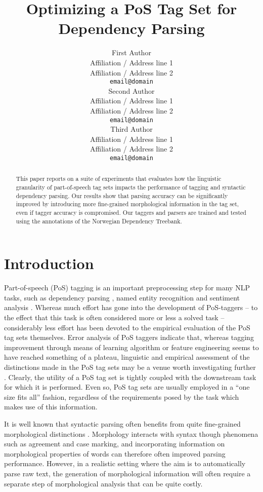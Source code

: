 \documentclass[11pt,a4paper]{article}
\title{Optimizing a PoS Tag Set for Dependency Parsing}
\author{First Author \\
  Affiliation / Address line 1 \\
  Affiliation / Address line 2 \\
  {\tt email@domain} \\\And
  Second Author \\
  Affiliation / Address line 1 \\
  Affiliation / Address line 2 \\
  {\tt email@domain}  \\\And
  Third Author \\
  Affiliation / Address line 1 \\
  Affiliation / Address line 2 \\
  {\tt email@domain} \\}
\date{}
\begin{document}
\maketitle
\begin{abstract}

This paper reports on a suite of experiments that evaluates how the linguistic
granularity of part-of-speech tag sets impacts the performance of tagging and
syntactic dependency parsing. Our results show that parsing accuracy can be
significantly improved by introducing more fine-grained morphological
information in the tag set, even if tagger accuracy is compromised. Our taggers
and parsers are  trained and tested using the annotations of the Norwegian
Dependency Treebank. 

\end{abstract}


\section{Introduction}
\label{sec:intro}
Part-of-speech (PoS) tagging is an important preprocessing step for many NLP
tasks, such as dependency parsing \cite{Niv:Hal:Kub:07,Haj:Cia:Joh:09}, named
entity recognition \cite{Tjo:DeM:03} and sentiment analysis
\cite{Wil:Wie:Hof:09}. Whereas much effort has gone into the development of
PoS-taggers -- to the effect that this task is often considered more or less a
solved task -- considerably less effort has been devoted to the empirical
evaluation of the PoS tag sets themselves. Error analysis of PoS taggers
indicate that, whereas tagging improvement through means of learning algorithm
or feature engineering seems to have reached something of a plateau, linguistic
and empirical assessment of the distinctions made in the PoS tag sets may be a
venue worth investigating further \cite{Man:11}. Clearly, the utility of a PoS
tag set is tightly coupled with the downstream task for which it is performed.
Even so, PoS tag sets are usually employed in a ``one size fits all'' fashion,
regardless of the requirements posed by the task which makes use of this
information.

It is well known that syntactic parsing often benefits from quite fine-grained
morphological distinctions \cite{Zha:Niv:11,See:Kuh:13}. Morphology interacts
with syntax though phenomena such as agreement and case marking, and
incorporating information on morphological properties of words can therefore
often improved parsing performance. However, in a realistic setting where the
aim is to automatically parse raw text, the generation of morphological
information will often require a separate step of morphological analysis that
can be quite costly.
\end{document}
